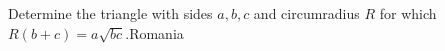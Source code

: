 Determine the triangle with sides $a,b,c$ and circumradius $R$ for which $R(b+c) = a\sqrt{bc}$.Romania